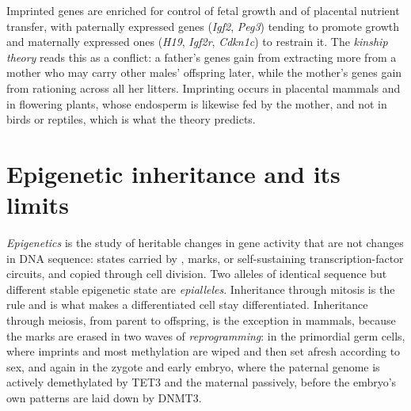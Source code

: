 \begin{remark}\label{rem:b3:chromatin-epigenetics:kinship}
Imprinted genes are enriched for control of fetal growth and of
placental nutrient transfer, with paternally expressed genes
(\emph{Igf2}, \emph{Peg3}) tending to promote growth and maternally
expressed ones (\emph{H19}, \emph{Igf2r}, \emph{Cdkn1c}) to restrain
it. The \emph{kinship theory} reads this as a conflict: a father's
genes gain from extracting more from a mother who may carry other
males' offspring later, while the mother's genes gain from rationing
across all her litters. Imprinting occurs in placental mammals and in
flowering plants, whose endosperm is likewise fed by the mother, and
not in birds or reptiles, which is what the theory predicts.
\end{remark}

\section{Epigenetic inheritance and its limits}

\begin{definition}[Epigenetics]\label{def:b3:chromatin-epigenetics:epigenetics}
\emph{Epigenetics} is the study of heritable changes in gene activity
that are not changes in DNA sequence: states carried by ,  marks, or self-sustaining transcription-factor
circuits, and copied through cell division. Two alleles of identical
sequence but different stable epigenetic state are \emph{epialleles}.
Inheritance through mitosis is the rule and is what makes a
differentiated cell stay differentiated. Inheritance through meiosis,
from parent to offspring, is the exception in mammals, because the
marks are erased in two waves of \emph{reprogramming}: in the
primordial germ cells, where imprints and most methylation are wiped
and then set afresh according to sex, and again in the zygote and early
embryo, where the paternal genome is actively demethylated by TET3 and
the maternal passively, before the embryo's own patterns are laid down
by DNMT3.
\end{definition}

